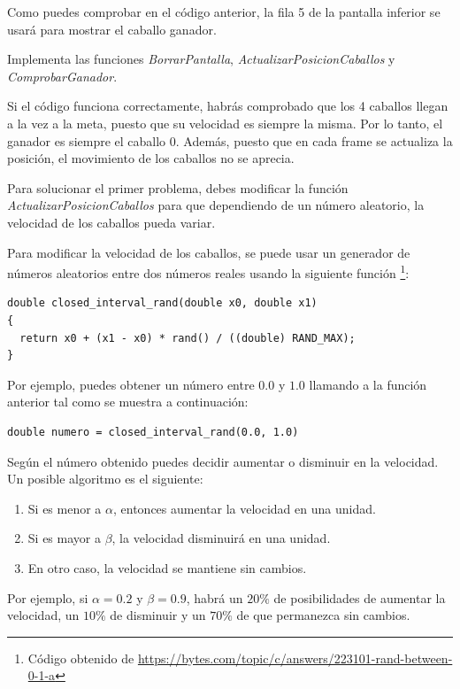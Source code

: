 Como puedes comprobar en el código anterior, la fila 5 de la pantalla inferior se usará para mostrar el caballo ganador.

\begin{exercise}
	Implementa las funciones \textit{BorrarPantalla}, \textit{ActualizarPosicionCaballos} y \textit{ComprobarGanador}.
\end{exercise}

Si el código funciona correctamente, habrás comprobado que los 4 caballos llegan a la vez a la meta, puesto que su velocidad es siempre la misma. Por lo tanto, el ganador es siempre el caballo 0. Además, puesto que en cada frame se actualiza la posición, el movimiento de los caballos no se aprecia. 

Para solucionar el primer problema, debes modificar la función \textit{ActualizarPosicionCaballos} para que dependiendo de un número aleatorio, la velocidad de los caballos pueda variar.

Para modificar la velocidad de los caballos, se puede usar un generador de números aleatorios entre dos números reales usando la siguiente función \footnote{Código obtenido de \url{https://bytes.com/topic/c/answers/223101-rand-between-0-1-a}}:

\begin{lstlisting}
double closed_interval_rand(double x0, double x1)
{
  return x0 + (x1 - x0) * rand() / ((double) RAND_MAX);
}
\end{lstlisting}

Por ejemplo, puedes obtener un número entre $0.0$ y $1.0$ llamando a la función anterior tal como se muestra a continuación:

\begin{lstlisting}
double numero = closed_interval_rand(0.0, 1.0)
\end{lstlisting}

Según el número obtenido puedes decidir aumentar o disminuir en la velocidad. Un posible algoritmo es el siguiente:

\begin{enumerate}
\item Si es menor a $\alpha$, entonces aumentar la velocidad en una unidad.
%
\item Si es mayor a $\beta$, la velocidad disminuirá en una unidad. 
%
\item  En otro caso, la velocidad se mantiene sin cambios. 
\end{enumerate}

Por ejemplo, si $\alpha=0.2$ y $\beta=0.9$, habrá un $20\%$ de posibilidades de aumentar la velocidad, un $10\%$ de disminuir y un $70\%$ de que permanezca sin cambios.
  
